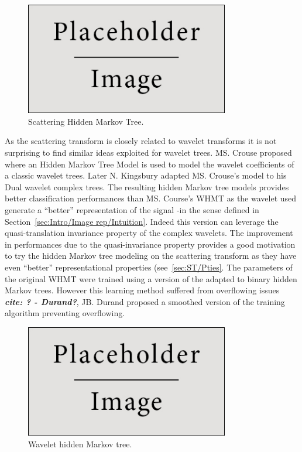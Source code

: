 \documentclass[a4paper,11pt]{report}
\begin{document}
		\begin{figure}
				\begin{center}
					\includegraphics[width=3.5in]{placeholder.jpg}
					\caption{Scattering Hidden Markov Tree.} %
					\label{fig:SCHMT 1}
				\end{center}
		\end{figure}
		
		As the scattering transform is closely related to wavelet transforms it is not surprising to find similar ideas exploited for wavelet trees. MS. Crouse proposed where an Hidden Markov Tree Model is used to model the wavelet coefficients \cite{crouse1998wavelet} of a classic wavelet trees. Later N. Kingsbury \cite{kingsbury2001complex} adapted MS. Crouse's model to his Dual wavelet complex trees. The resulting hidden Markov tree models provides better classification performances than MS. Course's WHMT as the wavelet used generate a ``better'' representation of the signal -in the sense defined in Section~\ref{sec:Intro/Image rep/Intuition}. Indeed this version can leverage the quasi-translation invariance property of the complex wavelets. The improvement in performances due to the quasi-invariance property provides a good motivation to try the hidden Markov tree modeling on the scattering transform as they have even ``better'' representational properties (see~\ref{sec:ST/Pties}. The parameters of the original WHMT were trained using a version of the  adapted to binary hidden Markov trees. However this learning method suffered from overflowing issues \textbf{\textit{cite: ? - Durand?}}, JB. Durand \cite{durand2004computational} proposed a smoothed version of the training algorithm preventing overflowing.\\
   
		\begin{figure}
				\begin{center}
					\includegraphics[width=3.5in]{placeholder.jpg}
					\caption{Wavelet hidden Markov tree.} %
					\label{fig:WHMT}
				\end{center}
		\end{figure}
	  
\end{document}
